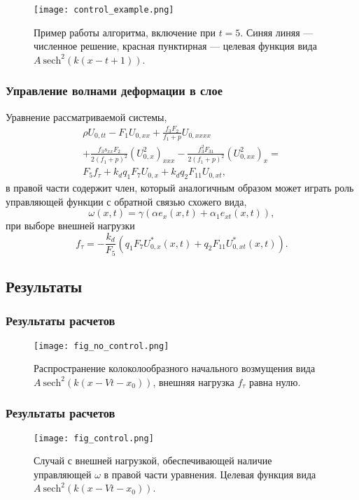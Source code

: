 \begin{frame}
	\begin{figure}
		\begin{center}
			\texttt{[image: control\_example.png]}
		\end{center}
		Пример работы алгоритма, включение при $t = 5$. Синяя линяя --- численное решение, красная пунктирная --- целевая функция вида $A~ {\text{sech}}^2(k (x- t+1))$.
	\end{figure}
\end{frame}

\begin{frame}
	\frametitle{Управление волнами деформации в слое}

Уравнение рассматриваемой системы,
\begin{multline*}
	\rho U_{0,tt}- F_1 U_{0,xx}+ \frac{f_3 F_2}{f_1+p}U_{0,xxxx}\\+\frac{f_3 s_{xx} F_{2}}{2(f_1+p)^2} (U_{0,x}^2)_{xxx}
	-\frac{f_3^2 F_{31}}{2(f_1+p)^2} (U_{0,xx}^2)_{x}=\\
	F_5 f_\tau+k_d q_1 F_7 U_{0,x} + k_d q_2 F_{11}U _{0,xt},
\end{multline*}
в правой части содержит член, который аналогичным образом может играть роль управляющей функции с обратной связью схожего вида,
$$
\omega(x,t)=\gamma \left(\alpha e_x(x,t)+\alpha_1 e_{xt}(x,t)\right),
$$
при выборе внешней нагрузки
$$
f_\tau=-\frac{k_d}{F_5}\left(q_1 F_7 U^*_{0,x}(x,t)+  q_2 F_{11} U_{0,xt}^*(x,t)\right).
$$
\end{frame}	

\subsection{Результаты}
\frametitle{Результаты расчетов}
\begin{frame}
	\begin{figure}
		\begin{center}
			\texttt{[image: fig\_no\_control.png]}
		\end{center}
		Распространение колоколообразного начального возмущения вида $A~{\text{sech}}^2 (k (x-V t-x_0))$, внешняя нагрузка $f_\tau$ равна нулю.
	\end{figure}
\end{frame}

\begin{frame}
	\frametitle{Результаты расчетов}
	\begin{figure}
		\begin{center}
			\texttt{[image: fig\_control.png]}
		\end{center}
		Случай с внешней нагрузкой, обеспечивающей наличие управляющей $\omega$ в правой части уравнения. Целевая функция вида $A~{\text{sech}}^2 (k (x-V t-x_0))$.
	\end{figure}
\end{frame}

